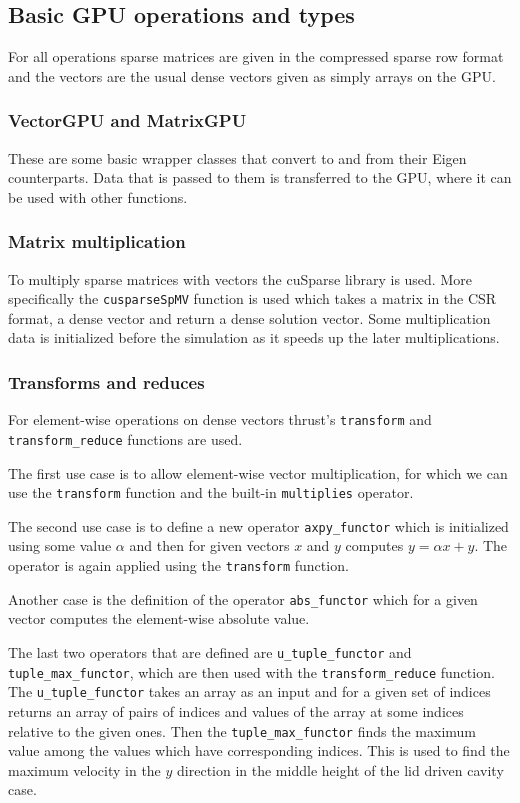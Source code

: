 \documentclass{article}
\begin{document}
\subsection{Basic GPU operations and types}
For all operations sparse matrices are given in the compressed sparse row format and the vectors
are the usual dense vectors given as simply arrays on the GPU.
\subsubsection{VectorGPU and MatrixGPU}
These are some basic wrapper classes that convert to and from their Eigen counterparts.
Data that is passed to them is transferred to the GPU, where it can be used with other functions.
\subsubsection{Matrix multiplication}
To multiply sparse matrices with vectors the cuSparse library is used. More specifically the 
\verb|cusparseSpMV| function is used which takes a matrix in the CSR format, a dense vector and 
return a dense solution vector. Some multiplication data is initialized 
before the simulation as it speeds up the later multiplications. 
\subsubsection{Transforms and reduces}
For element-wise operations on dense vectors thrust's \verb|transform| and \verb|transform_reduce| 
functions are used.

The first use case is to allow element-wise vector multiplication, for which we can use 
the \verb|transform| function and the built-in \verb|multiplies| operator.

The second use case is to define a new operator \verb|axpy_functor| which is initialized using some 
value \(\alpha\) and then for given vectors \(x\) and \(y\) computes \(y = \alpha x + y\).
The operator is again applied using the \verb|transform| function.

Another case is the definition of the operator \verb|abs_functor| which for a given vector 
computes the element-wise absolute value.

The last two operators that are defined are \verb|u_tuple_functor| and \verb|tuple_max_functor|,
which are then used with the \verb|transform_reduce| function. The \verb|u_tuple_functor| takes 
an array as an input and for a given set of indices returns an array of pairs of indices and 
values of the array at some indices relative to the given ones. Then the \verb|tuple_max_functor| 
finds the maximum value among the values which have corresponding indices. This is used to find 
the maximum velocity in the \(y\) direction in the middle height of the lid driven cavity case.
\end{document}

